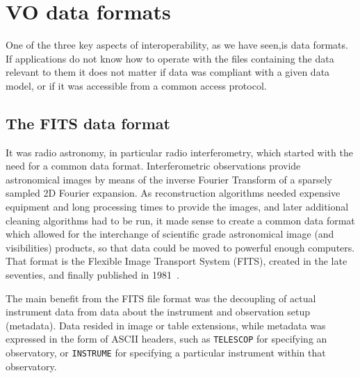 	\section{VO data formats} %
	\label{sub:vo_data_formats}

		
		 One of the three key aspects of interoperability, as we
		have seen,is data formats. If applications do not know how
		to operate with the files containing the data relevant to
		them it does not matter if data was compliant with a given
		data model, or if it was accessible from a common access
		protocol.

		\subsection{The FITS data format} %
		\label{ssub:the_fits_data_format}

			It was radio astronomy, in particular radio
			interferometry, which started with the need for a
			common data format. Interferometric observations
			provide astronomical images by means of the inverse
			Fourier Transform of a sparsely sampled 2D Fourier
			expansion. As reconstruction algorithms needed
			expensive equipment and long processing times to
			provide the images, and later additional cleaning
			algorithms had to be run, it made sense to create a
			common data format which allowed for the interchange of
			scientific grade astronomical image (and visibilities)
			products, so that data could be moved to powerful
			enough computers. That format is the Flexible Image
			Transport System (FITS), created in the late seventies,
			and finally published in
			1981~\cite{1981A&AS...44..363W}.
			
			 The main benefit from the FITS file format was the
			decoupling of actual instrument data from data about
			the instrument and observation setup (metadata). Data
			resided in image or table extensions, while metadata
			was expressed in the form of ASCII headers, such as
			\texttt{TELESCOP} for specifying an observatory, or
			\texttt{INSTRUME} for specifying a particular
			instrument within that observatory.
			

